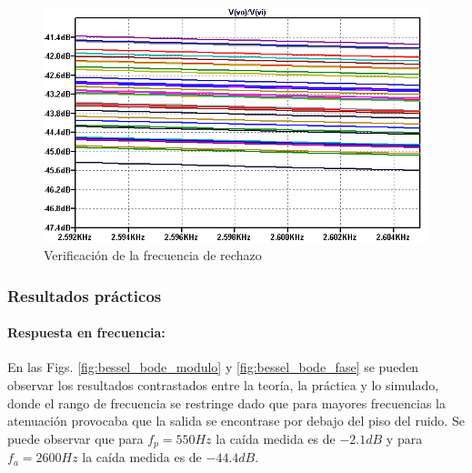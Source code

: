 \begin{figure}[H]
    \centering
    \includegraphics[scale=0.6]{../EJ1/Recursos/bessel_verificacion_fa.png}
    \caption{Verificaci\'on de la frecuencia de rechazo}
\end{figure}

\subsubsection{Resultados pr\'acticos}

\paragraph{Respuesta en frecuencia:} En las Figs. \ref{fig:bessel_bode_modulo} y \ref{fig:bessel_bode_fase} se pueden observar los resultados
contrastados entre la teor\'ia, la pr\'actica y lo simulado, donde el rango de frecuencia se restringe dado que para mayores frecuencias la atenuaci\'on
provocaba que la salida se encontrase por debajo del piso del ruido. Se puede observar que para $f_p = 550Hz$ la ca\'ida medida es de $-2.1dB$ y para $f_a = 2600Hz$ la ca\'ida
medida es de $-44.4dB$.

